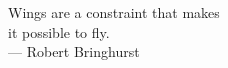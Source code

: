 \cleardoublepage
\thispagestyle{empty}


\vspace*{8cm}
%
\begin{raggedleft}
    	Wings are a constraint that makes \\
        it possible to fly.\\
     --- Robert Bringhurst\\
\end{raggedleft}
%




